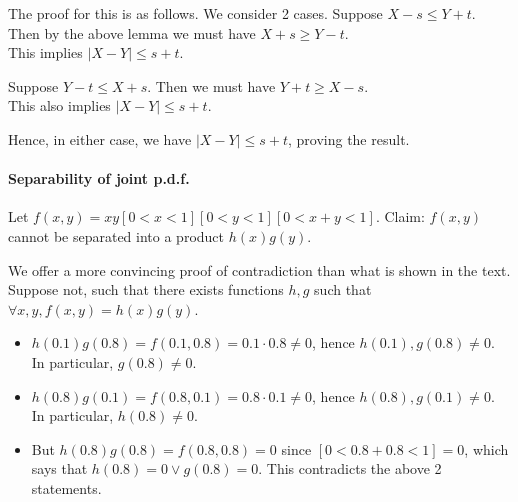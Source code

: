\documentclass{article}
\begin{document}
The proof for this is as follows. We consider 2 cases.
Suppose $X-s \leq Y+t$. Then by the above lemma we must have $X+s\geq  Y-t$.\\
This implies $|X-Y|\leq s+t$.


Suppose $Y-t \leq X+s$. Then we must have $Y+t\geq X-s$.\\
This also implies $|X-Y|\leq s+t$.

Hence, in either case, we have $|X-Y|\leq s+t$, proving the result.


\paragraph{Separability of joint p.d.f.} Let $f(x,y) = xy[0<x<1][0<y<1][0<x+y<1]$. Claim: $f(x,y)$ cannot be separated into a product $h(x)g(y)$.

We offer a more convincing proof of contradiction than what is shown in the text. Suppose not, such that there exists functions $h,g$ such that $\forall x,y, f(x,y) = h(x)g(y)$.

\begin{itemize}
	\item $h(0.1)g(0.8) = f(0.1,0.8) = 0.1\cdot 0.8\neq 0$, hence $h(0.1), g(0.8)\neq 0$. In particular, $g(0.8)\neq 0$.
	\item $h(0.8)g(0.1) = f(0.8,0.1) = 0.8\cdot 0.1\neq 0$, hence $h(0.8), g(0.1)\neq 0$. In particular, $h(0.8)\neq 0$.
	\item But $h(0.8)g(0.8) = f(0.8,0.8) = 0$ since $[0 < 0.8 + 0.8 < 1] = 0$, which says that $h(0.8) = 0\lor g(0.8) = 0$. This contradicts the above 2 statements.
\end{itemize}
\end{document}
